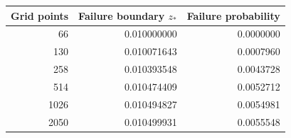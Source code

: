 \begin{tabular}{rrr}
\toprule
Grid points & Failure boundary $z_*$ & Failure probability \\
\midrule
66 & 0.010000000 & 0.0000000 \\
130 & 0.010071643 & 0.0007960 \\
258 & 0.010393548 & 0.0043728 \\
514 & 0.010474409 & 0.0052712 \\
1026 & 0.010494827 & 0.0054981 \\
2050 & 0.010499931 & 0.0055548 \\
\bottomrule
\end{tabular}
